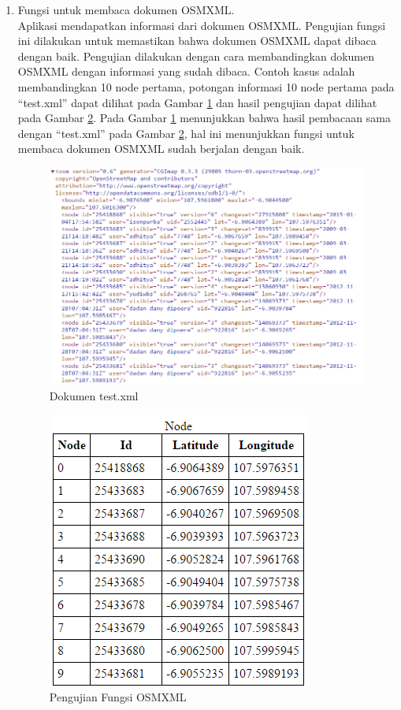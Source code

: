 \begin{enumerate}
  \item Fungsi untuk membaca dokumen OSMXML.\\
  Aplikasi mendapatkan informasi dari dokumen OSMXML. Pengujian
  fungsi ini dilakukan untuk memastikan bahwa dokumen OSMXML dapat dibaca dengan
  baik. Pengujian dilakukan dengan cara membandingkan dokumen OSMXML dengan
  informasi yang sudah dibaca. Contoh kasus adalah membandingkan 10 node
  pertama, potongan informasi 10 node pertama pada ``test.xml'' dapat dilihat
  pada Gambar \ref{fig:pu_osmxml2} dan hasil pengujian dapat dilihat pada Gambar
  \ref{fig:pu_osmxml1}. Pada Gambar \ref{fig:pu_osmxml2} menunjukkan bahwa hasil
  pembacaan sama dengan ``test.xml'' pada Gambar \ref{fig:pu_osmxml1}, hal ini
  menunjukkan fungsi untuk membaca dokumen OSMXML sudah berjalan dengan baik.
\begin{figure}[h]
\centering
\includegraphics[scale=0.7]{Gambar/pu_osmxml2}
\caption[Dokumen test.xml]{Dokumen test.xml}
\label{fig:pu_osmxml2}
\end{figure}

\begin{figure}[h]
\centering
\includegraphics[scale=1]{Gambar/pu_osmxml1}
\caption[Pengujian Fungsi OSMXML]{Pengujian Fungsi OSMXML}
\label{fig:pu_osmxml1}
\end{figure}
\clearpage


\end{enumerate}
